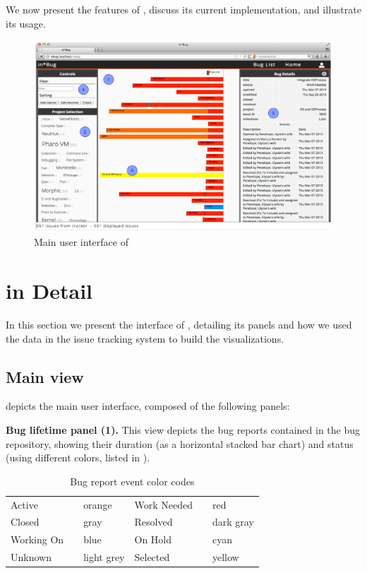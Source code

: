 We now present the features of \ib, discuss its current implementation, and illustrate its usage.


\begin{figure}[t]
\centering
\includegraphics[width=\linewidth]{Images/visualize/inbug-list.pdf}
\caption{Main user interface of \ib}
\label{fig:inbug}
\end{figure}

\section{\ib in Detail}\label{sec:visualize-details}

In this section we present the interface of \ib, detailing its panels and how we used the data in the issue tracking system to build the visualizations.

\subsection{Main view}\label{main-view}

 depicts the main user interface, composed of the following panels:

\textbf{Bug lifetime panel (1).} \label{bug-lifetime-panel} This view depicts the bug reports contained in the bug repository, showing their duration (as a horizontal stacked bar chart) and status (using different colors, listed in ).

\begin{table}[ht]\small
\centering
\caption{Bug report event color codes}
\label{tab-colors}
\begin{tabular}{l p{0.1cm} l | l p{0.1cm} l } \hline
Active & \cellcolor{active} & orange & Work Needed & \cellcolor{work needed} & red \\
Closed & \cellcolor{closed} & gray & Resolved & \cellcolor{resolved} & dark gray \\
Working On & \cellcolor{working on} & blue & On Hold & \cellcolor{on hold} & cyan \\
Unknown & \cellcolor{unknown} & light grey & Selected & \cellcolor{yellow} & yellow \\ \hline
\end{tabular}
\end{table}


